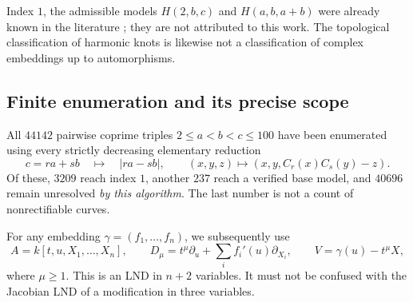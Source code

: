 Index $1$, the admissible models $H(2,b,c)$ and $H(a,b,a+b)$ were already
known in the literature \cite{FF}; they are not attributed to this work.
The topological classification of harmonic knots \cite{KP} is likewise
not a classification of complex embeddings up to automorphisms.

\subsection{Finite enumeration and its precise scope}
All $44142$ pairwise coprime triples
$2\le a<b<c\le100$ have been enumerated using every strictly decreasing
elementary reduction
\[
c=ra+sb\quad\longmapsto\quad |ra-sb|,
\qquad (x,y,z)\longmapsto(x,y,C_r(x)C_s(y)-z).
\]
Of these, $3209$ reach index $1$, another $237$ reach a verified base
model, and $40696$ remain unresolved \emph{by this algorithm}.
The last number is not a count of nonrectifiable curves.

For any embedding $\gamma=(f_1,\ldots,f_n)$, we subsequently use
\[
A=k[t,u,X_1,\ldots,X_n],\qquad
D_\mu=t^\mu\partial_u+\sum_i f_i'(u)\partial_{X_i},\qquad
V=\gamma(u)-t^\mu X,
\]
where $\mu\ge1$. This is an LND in $n+2$ variables. It must not be confused
with the Jacobian LND of a modification in three variables.
